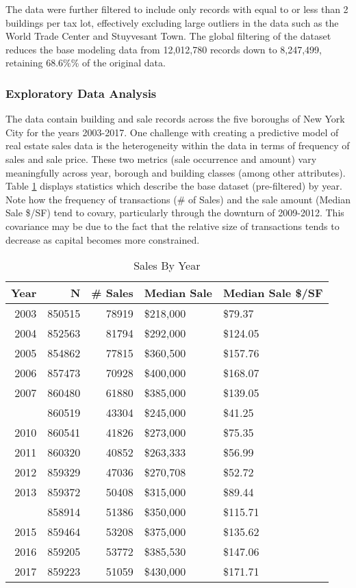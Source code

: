 \documentclass[12pt,]{article}
\begin{document}
The data were further filtered to include only records with equal to or
less than 2 buildings per tax lot, effectively excluding large outliers
in the data such as the World Trade Center and Stuyvesant Town. The
global filtering of the dataset reduces the base modeling data from
12,012,780 records down to 8,247,499, retaining 68.6\%\% of the original
data.

\hypertarget{exploratory-data-analysis}{%
\subsubsection{Exploratory Data
Analysis}\label{exploratory-data-analysis}}

The data contain building and sale records across the five boroughs of
New York City for the years 2003-2017. One challenge with creating a
predictive model of real estate sales data is the heterogeneity within
the data in terms of frequency of sales and sale price. These two
metrics (sale occurrence and amount) vary meaningfully across year,
borough and building classes (among other attributes). Table
\ref{tab:by_year} displays statistics which describe the base dataset
(pre-filtered) by year. Note how the frequency of transactions (\# of
Sales) and the sale amount (Median Sale \$/SF) tend to covary,
particularly through the downturn of 2009-2012. This covariance may be
due to the fact that the relative size of transactions tends to decrease
as capital becomes more constrained.

\begin{table}

\caption{\label{tab:by_year}\label{tab:by_year} Sales By Year}
\centering
\begin{tabular}[t]{rrrll}
\toprule
Year & N & \# Sales & Median Sale & Median Sale \$/SF\\
\midrule
2003 & 850515 & 78919 & \$218,000 & \$79.37\\
2004 & 852563 & 81794 & \$292,000 & \$124.05\\
2005 & 854862 & 77815 & \$360,500 & \$157.76\\
2006 & 857473 & 70928 & \$400,000 & \$168.07\\
2007 & 860480 & 61880 & \$385,000 & \$139.05\\
\addlinespace
2009 & 860519 & 43304 & \$245,000 & \$41.25\\
2010 & 860541 & 41826 & \$273,000 & \$75.35\\
2011 & 860320 & 40852 & \$263,333 & \$56.99\\
2012 & 859329 & 47036 & \$270,708 & \$52.72\\
2013 & 859372 & 50408 & \$315,000 & \$89.44\\
\addlinespace
2014 & 858914 & 51386 & \$350,000 & \$115.71\\
2015 & 859464 & 53208 & \$375,000 & \$135.62\\
2016 & 859205 & 53772 & \$385,530 & \$147.06\\
2017 & 859223 & 51059 & \$430,000 & \$171.71\\
\bottomrule
\end{tabular}
\end{table}
\end{document}
